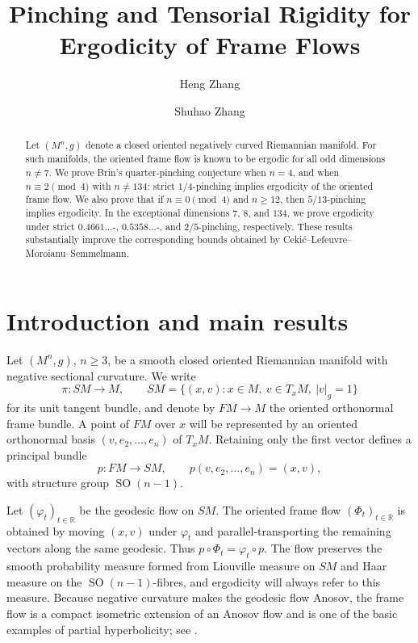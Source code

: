 \documentclass[reqno,11pt]{amsart}
\title[Frame Flows]
{Pinching and Tensorial Rigidity for Ergodicity of Frame Flows}
\author{Heng Zhang}
\author{Shuhao Zhang}
\theoremstyle{definition}
\newcommand{\SM}{SM}
\newcommand{\FM}{FM}
\newcommand{\SO}{\operatorname{SO}}
\newcommand{\bbR}{\mathbb R}
\begin{document}
\begin{abstract}
Let $(M^n,g)$ denote a closed oriented negatively curved Riemannian manifold. For such manifolds, the oriented frame flow is known to be ergodic for all odd dimensions $n\neq7$. We prove Brin's quarter-pinching conjecture when
$n=4$, and when $n\equiv2\pmod4$ with $n\neq134$: strict $1/4$-pinching
implies ergodicity of the oriented frame flow. We also prove that if
$n\equiv0\pmod4$ and $n\geq12$, then $5/13$-pinching implies
ergodicity. In the exceptional dimensions $7$, $8$, and $134$, we prove
ergodicity under strict $0.4661...$-, $0.5358...$-, and
$2/5$-pinching, respectively.
These results substantially improve the
corresponding bounds obtained by Ceki\'c--Lefeuvre--Moroianu--Semmelmann. 
\end{abstract}

\maketitle


\section{Introduction and main results}\label{sec:introduction}

Let $(M^n,g)$, $n\geq3$, be a smooth closed oriented Riemannian manifold with
negative sectional curvature. We write
$$
  \pi:\SM\longrightarrow M,
  \qquad
  \SM=\{(x,v):x\in M,\ v\in T_xM,\ |v|_g=1\}
$$
for its unit tangent bundle, and denote by $\FM\to M$ the oriented
orthonormal frame bundle.  A point of $\FM$ over $x$ will be represented by
an oriented orthonormal basis
$
  (v,e_2,\ldots,e_n)
$
of $T_xM$.  Retaining only the first vector defines a principal bundle
$$
  p:\FM\longrightarrow\SM,
  \qquad
  p(v,e_2,\ldots,e_n)=(x,v),
$$
with structure group $\SO(n-1)$.

Let $(\varphi_t)_{t\in\bbR}$ be the geodesic flow on $\SM$.  The oriented
frame flow $(\Phi_t)_{t\in\bbR}$ is obtained by moving $(x,v)$ under
$\varphi_t$ and parallel-transporting the remaining vectors along the same
geodesic.  Thus
$
  p\circ\Phi_t=\varphi_t\circ p.
$
The flow preserves the smooth probability measure formed from Liouville
measure on $\SM$ and Haar measure on the $\SO(n-1)$-fibres, and ergodicity
will always refer to this measure.  Because negative curvature makes the
geodesic flow Anosov, the frame flow is a compact isometric extension of an
Anosov flow and is one of the basic examples of partial hyperbolicity; see
\cite{HasselblattPesin06}.
\end{document}
